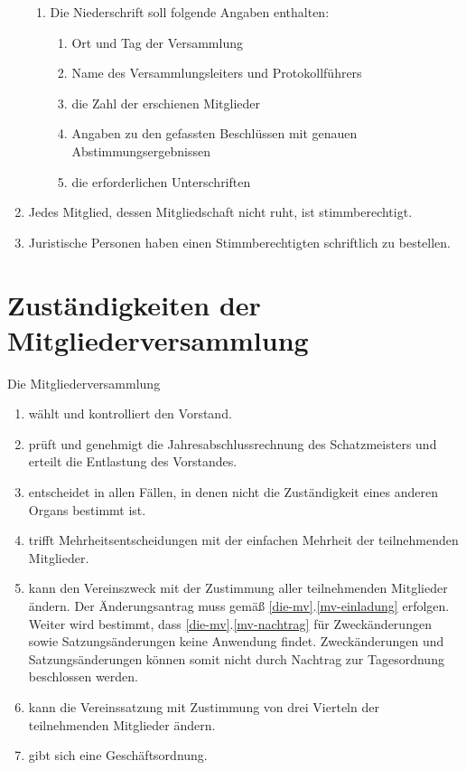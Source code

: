 \documentclass[a4paper, 12pt]{scrartcl}
\begin{document}
\begin{enumerate}
\begin{enumerate}
			\item Die Niederschrift soll folgende Angaben enthalten:
			\begin{enumerate}
	  		\item Ort und Tag der Versammlung
	    	\item Name des Versammlungsleiters und Protokollführers
	    	\item die Zahl der erschienen Mitglieder
	    	\item Angaben zu den gefassten Beschlüssen mit genauen Abstimmungsergebnissen
	    	\item die erforderlichen Unterschriften
			\end{enumerate}
		\end{enumerate}
	\item Jedes Mitglied, dessen Mitgliedschaft nicht ruht, ist stimmberechtigt.
	\item Juristische Personen haben einen Stimmberechtigten schriftlich zu bestellen.
\end{enumerate}

\section{Zuständigkeiten der Mitgliederversammlung}
Die Mitgliederversammlung
\begin{enumerate}
	\item wählt und kontrolliert den Vorstand.
	\item prüft und genehmigt die Jahresabschlussrechnung des Schatzmeisters und erteilt die Entlastung des Vorstandes.
	\item entscheidet in allen Fällen, in denen nicht die Zuständigkeit eines anderen Organs bestimmt ist.
	\item trifft Mehrheitsentscheidungen mit der einfachen Mehrheit der teilnehmenden Mitglieder.
	\item kann den Vereinszweck mit der Zustimmung aller teilnehmenden
    Mitglieder ändern. Der Änderungsantrag muss gemäß
    \ref{die-mv}.\ref{mv-einladung} erfolgen. Weiter wird bestimmt, dass
    \ref{die-mv}.\ref{mv-nachtrag} für Zweckänderungen sowie
    Satzungsänderungen keine Anwendung findet. Zweckänderungen und
    Satzungsänderungen können somit nicht durch Nachtrag zur Tagesordnung beschlossen werden.
	\item kann die Vereinssatzung mit Zustimmung von drei Vierteln der teilnehmenden Mitglieder ändern. 
	\item gibt sich eine Geschäftsordnung.
\end{enumerate}
\end{document}
